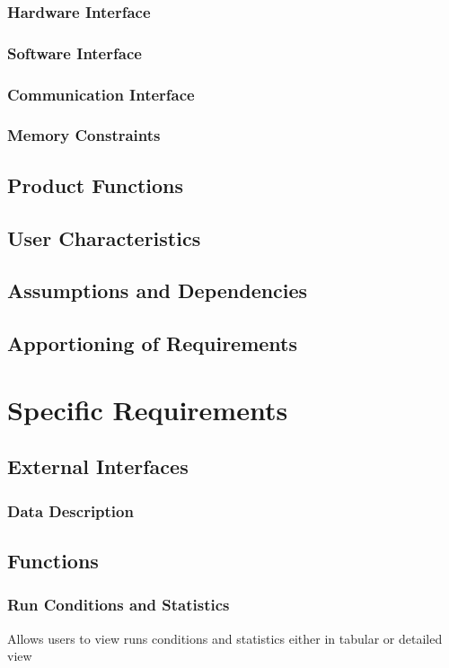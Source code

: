\documentclass[a4paper,11pt]{book}
\begin{document}
\subsection{Hardware Interface}
\subsection{Software Interface}
\subsection{Communication Interface}
\subsection{Memory Constraints}
\section{Product Functions}
\section{User Characteristics}
\section{Assumptions and Dependencies}
\section{Apportioning of Requirements}

\chapter{Specific Requirements}
\section{External Interfaces}
\subsection{Data Description}
\section{Functions}
\subsection{Run Conditions and Statistics}
Allows users to view runs conditions and statistics either in tabular or detailed view
\end{document}
